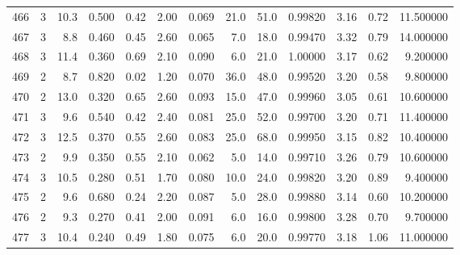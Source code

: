 \begin{tabular}{lrrrrrrrrrrrr}
466  &        3 &           10.3 &             0.500 &         0.42 &            2.00 &      0.069 &                 21.0 &                  51.0 &  0.99820 &  3.16 &       0.72 &  11.500000 \\
467  &        3 &            8.8 &             0.460 &         0.45 &            2.60 &      0.065 &                  7.0 &                  18.0 &  0.99470 &  3.32 &       0.79 &  14.000000 \\
468  &        3 &           11.4 &             0.360 &         0.69 &            2.10 &      0.090 &                  6.0 &                  21.0 &  1.00000 &  3.17 &       0.62 &   9.200000 \\
469  &        2 &            8.7 &             0.820 &         0.02 &            1.20 &      0.070 &                 36.0 &                  48.0 &  0.99520 &  3.20 &       0.58 &   9.800000 \\
470  &        2 &           13.0 &             0.320 &         0.65 &            2.60 &      0.093 &                 15.0 &                  47.0 &  0.99960 &  3.05 &       0.61 &  10.600000 \\
471  &        3 &            9.6 &             0.540 &         0.42 &            2.40 &      0.081 &                 25.0 &                  52.0 &  0.99700 &  3.20 &       0.71 &  11.400000 \\
472  &        3 &           12.5 &             0.370 &         0.55 &            2.60 &      0.083 &                 25.0 &                  68.0 &  0.99950 &  3.15 &       0.82 &  10.400000 \\
473  &        2 &            9.9 &             0.350 &         0.55 &            2.10 &      0.062 &                  5.0 &                  14.0 &  0.99710 &  3.26 &       0.79 &  10.600000 \\
474  &        3 &           10.5 &             0.280 &         0.51 &            1.70 &      0.080 &                 10.0 &                  24.0 &  0.99820 &  3.20 &       0.89 &   9.400000 \\
475  &        2 &            9.6 &             0.680 &         0.24 &            2.20 &      0.087 &                  5.0 &                  28.0 &  0.99880 &  3.14 &       0.60 &  10.200000 \\
476  &        2 &            9.3 &             0.270 &         0.41 &            2.00 &      0.091 &                  6.0 &                  16.0 &  0.99800 &  3.28 &       0.70 &   9.700000 \\
477  &        3 &           10.4 &             0.240 &         0.49 &            1.80 &      0.075 &                  6.0 &                  20.0 &  0.99770 &  3.18 &       1.06 &  11.000000 \\

\end{tabular}
